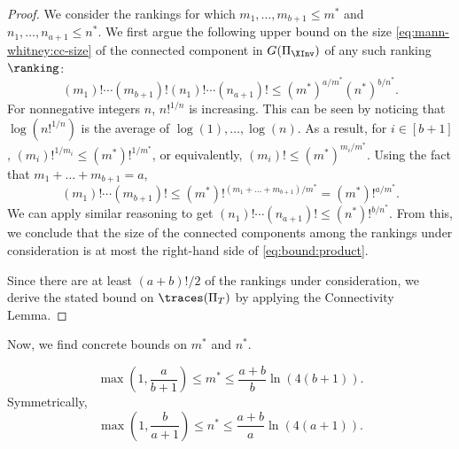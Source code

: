 \begin{proof}
We consider the rankings for which $m_1,\dots,m_{b+1}\le m^*$ and $n_1,\dots,n_{a+1}\le n^*$. We first argue the following upper bound on the size \eqref{eq:mann-whitney:cc-size} of the connected component in $G(\Pi_{\XInv})$ of any such ranking $\ranking$:
     \begin{equation}\label{eq:bound:product}
        (m_1)!\cdots (m_{b+1})!(n_1)!\cdots (n_{a+1})! \le (m^*)^{a/m^*}(n^*)^{b/n^*}.
    \end{equation}
For nonnegative integers $n$, $n!^{1/n}$ is increasing. This can be seen by noticing that $\log(n!^{1/n})$ is the average of $\log(1),\dots,\log(n)$. As a result, for $i \in [b+1]$, $(m_i)!^{1/m_i}\le (m^*)!^{1/m^*}$, or equivalently, $(m_i)!\le (m^*)^{m_i/m^*}$. Using the fact that $m_1+\dots +m_{b+1}=a$,
    \begin{equation*}
        (m_1)!\cdots (m_{b+1})!\le (m^*)!^{(m_1+\dots+m_{b+1})/m^*}=(m^*)!^{a/m^*}.
    \end{equation*}
We can apply similar reasoning to get $(n_1)!\cdots (n_{a+1})!\le (n^*)!^{b/n^*}$. From this, we conclude that the size of the connected components among the rankings under consideration is at most the right-hand side of \eqref{eq:bound:product}. 
    
Since there are at least $(a+b)!/2$ of the rankings under consideration, we derive the stated bound on $\traces(\Pi_T)$ by applying the Connectivity Lemma.
\end{proof}

Now, we find concrete bounds on $m^*$ and $n^*$.

\begin{proposition}
    \label{prop:mann-whitney:chunk-size}
    \[\max\left(1,\frac{a}{b+1}\right)\le m^* \le \frac{a+b}{b}\ln(4(b+1)). \]
    Symmetrically,
    \[\max\left(1,\frac{b}{a+1}\right)\le n^* \le \frac{a+b}{a}\ln(4(a+1)). \]
\end{proposition}

